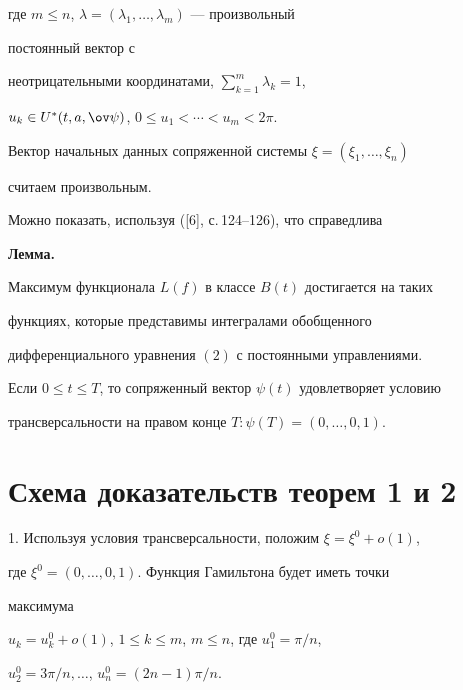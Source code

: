 где $m\le n$, $\lambda=(\lambda_1,\dotsc,\lambda_m)$ --- произвольный 


постоянный вектор с 


неотрицательными координатами, $\sum\limits^m_{k=1}\lambda_k=1$, 


$u_k\in U^*(t,a,\ov\psi)$, $0\le u_1<\dotsb<u_m<2\pi$. 


Вектор начальных данных сопряженной системы $\xi=(\xi_1,\dotsc,\xi_n)$ 


считаем произвольным. 


 


Можно показать, используя ([6], с.\,124--126), что справедлива 


\medskip 


 


{\bf Лемма.} {\it 


Максимум функционала $L(f)$ в классе $B(t)$ достигается на таких 


функциях, которые представимы интегралами обобщенного 


дифференциального уравнения $(2)$ с постоянными управлениями. 


} 


\medskip 


 


Если $0\le t\le T$, то сопряженный вектор $\psi(t)$ удовлетворяет условию 


трансверсальности на правом конце $T:\psi(T)=(0,\dotsc,0,1)$. 


 


\section{Схема доказательств теорем 1 и 2} 


 


1. Используя условия трансверсальности, положим $\xi=\xi^0+o(1)$, 


где $\xi^0=(0,\dotsc,0,1)$. Функция Гамильтона будет иметь точки 


максимума 


$u_k=u^0_k+o(1)$, $1\le k\le m$, $m\le n$, где $u^0_1=\pi/n$, 


$u^0_2=3\pi/n,\dotsc$, $u^0_n=(2n-1)\pi/n$. 


 


